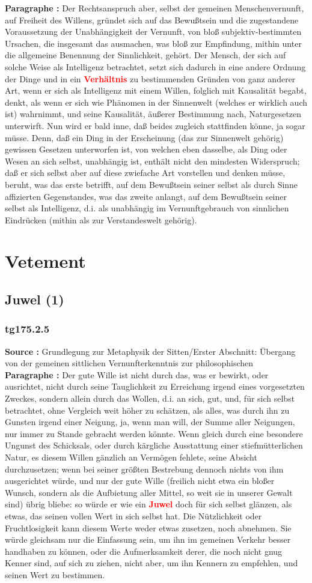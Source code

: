 \documentclass[a4paper,12pt,twoside]{book}
\newcommand{\match}[1]{\textcolor{red}{\textbf{#1}}}
\newcommand{\unnumberedchapter}[1]{
	\chapter*{#1}
	\addcontentsline{toc}{chapter}{#1}
	\markboth{#1}{#1}
}
\newcommand{\unnumberedsection}[1]{
	\section*{#1}
	\addcontentsline{toc}{section}{#1}
	\markright{#1}
}
\begin{document}
	\textbf{Paragraphe : }
	Der Rechtsanspruch aber, selbst der gemeinen Menschenvernunft, auf Freiheit des Willens, gründet sich auf das Bewußtsein und die zugestandene Voraussetzung der Unabhängigkeit der Vernunft, von bloß subjektiv-bestimmten Ursachen, die insgesamt das ausmachen, was bloß zur Empfindung, mithin unter die allgemeine Benennung der Sinnlichkeit, gehört. Der Mensch, der sich auf solche Weise als Intelligenz betrachtet, setzt sich dadurch in eine andere Ordnung der Dinge und in ein \match{Verhältnis} zu bestimmenden Gründen von ganz anderer Art, wenn er sich als Intelligenz mit einem Willen, folglich mit Kausalität begabt, denkt, als wenn er sich wie Phänomen in der Sinnenwelt (welches er wirklich auch ist) wahrnimmt, und seine Kausalität, äußerer Bestimmung nach, Naturgesetzen unterwirft. Nun wird er bald inne, daß beides zugleich stattfinden könne, ja sogar müsse. Denn, daß ein Ding in der Erscheinung (das zur Sinnenwelt gehörig) gewissen Gesetzen unterworfen ist, von welchen eben dasselbe, als Ding oder Wesen an sich selbst, unabhängig ist, enthält nicht den mindesten Widerspruch; daß er sich selbst aber auf diese zwiefache Art vorstellen und denken müsse, beruht, was das erste betrifft, auf dem Bewußtsein seiner selbst als durch Sinne affizierten Gegenstandes, was das zweite anlangt, auf dem Bewußtsein seiner selbst als Intelligenz, d.i. als unabhängig im Vernunftgebrauch von sinnlichen Eindrücken (mithin als zur Verstandeswelt gehörig). 
	
	\unnumberedchapter{Vetement} 
	\unnumberedsection{Juwel (1)} 
	\subsection*{tg175.2.5} 
	\textbf{Source : }Grundlegung zur Metaphysik der Sitten/Erster Abschnitt: Übergang von der gemeinen sittlichen Vernunfterkenntnis zur philosophischen\\  
	
	\textbf{Paragraphe : }Der gute Wille ist nicht durch das, was er bewirkt, oder ausrichtet, nicht durch seine Tauglichkeit zu Erreichung irgend eines vorgesetzten Zweckes, sondern allein durch das Wollen, d.i. an sich, gut, und, für sich selbst betrachtet, ohne Vergleich weit höher zu schätzen, als alles, was durch ihn zu Gunsten irgend einer Neigung, ja, wenn man will, der Summe aller Neigungen, nur immer zu Stande gebracht werden könnte. Wenn gleich durch eine besondere Ungunst des Schicksals, oder durch kärgliche Ausstattung einer stiefmütterlichen Natur, es diesem Willen gänzlich an Vermögen fehlete, seine Absicht durchzusetzen; wenn bei seiner größten Bestrebung dennoch nichts von ihm ausgerichtet würde, und nur der gute Wille (freilich nicht etwa ein bloßer Wunsch, sondern als die Aufbietung aller Mittel, so weit sie in unserer Gewalt sind) übrig bliebe: so würde er wie ein \match{Juwel} doch für sich selbst glänzen, als etwas, das seinen vollen Wert in sich selbst hat. Die Nützlichkeit oder Fruchtlosigkeit kann diesem Werte weder etwas zusetzen, noch abnehmen. Sie würde gleichsam nur die Einfassung sein, um ihn im gemeinen Verkehr besser handhaben zu können, oder die Aufmerksamkeit derer, die noch nicht gnug Kenner sind, auf sich zu ziehen, nicht aber, um ihn Kennern zu empfehlen, und seinen Wert zu bestimmen. 
	
\end{document}
